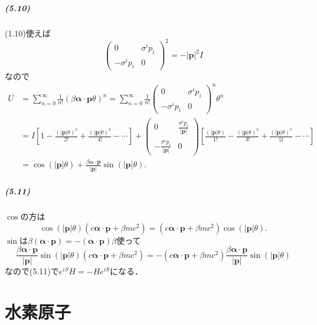 \paragraph{(5.10)}
(1.10)使えば
\[\begin{pmatrix}
0 & \sigma^ip_i\\
 - \sigma^ip_i & 0
\end{pmatrix}^2= - |\boldsymbol{p}|^2I\]
なので
\begin{align*}
  U & =\sum_{n=0}^\infty\frac{1}{n!}(\beta\boldsymbol{\alpha}\cdot\boldsymbol{p}\theta)^n=\sum_{n=0}^\infty\frac{1}{n!}
  \begin{pmatrix}
    0 & \sigma^ip_i\\
     - \sigma^ip_i & 0
  \end{pmatrix}
  ^n\theta^n\\
  & = I\left[1 - \frac{(|\boldsymbol{p}|\theta)^2}{2!} + \frac{(|\boldsymbol{p}|\theta)^4}{4!} - \cdots\right] +
  \begin{pmatrix}
    0 & \frac{\sigma^ip_i}{|\boldsymbol{p}|}\\
     - \frac{\sigma^ip_i}{|\boldsymbol{p}|} & 0
  \end{pmatrix}
  \left[\frac{(|\boldsymbol{p}|\theta)}{1!} - \frac{(|\boldsymbol{p}|\theta)^3}{3!} + \frac{(|\boldsymbol{p}|\theta)^5}{5!} - \cdots\right]\\
  & = \cos(|\boldsymbol{p}|\theta) + \frac{\beta\boldsymbol{\alpha}\cdot\boldsymbol{p}}{|\boldsymbol{p}|}\sin(|\boldsymbol{p}|\theta).
\end{align*}

\paragraph{(5.11)}
$\cos$の方は
\[\cos(|\boldsymbol{p}|\theta)(c\boldsymbol{\alpha}\cdot\boldsymbol{p} + \beta mc^2)=(c\boldsymbol{\alpha}\cdot\boldsymbol{p} + \beta mc^2)\cos(|\boldsymbol{p}|\theta).\]
$\sin$は$\beta(\boldsymbol{\alpha}\cdot\boldsymbol{p})= - (\boldsymbol{\alpha}\cdot\boldsymbol{p})\beta$使って
\[\frac{\beta\boldsymbol{\alpha}\cdot\boldsymbol{p}}{|\boldsymbol{p}|}\sin(|\boldsymbol{p}|\theta)(c\boldsymbol{\alpha}\cdot\boldsymbol{p} + \beta mc^2)= - (c\boldsymbol{\alpha}\cdot\boldsymbol{p} + \beta mc^2)\frac{\beta\boldsymbol{\alpha}\cdot\boldsymbol{p}}{|\boldsymbol{p}|}\sin(|\boldsymbol{p}|\theta)\]
なので(5.11)で$e^{iS}H= - He^{iS}$になる．

\chapter{水素原子}
